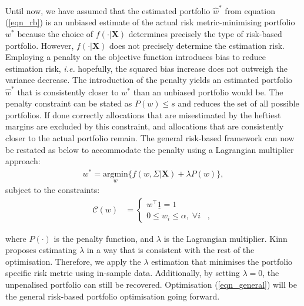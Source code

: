 \documentclass[a4paper,11pt,nocenter,bold,noupper,headcount]{mythesis}
\theoremstyle{plain}
\theoremstyle{definition}
\begin{document}
Until now, we have assumed that the estimated portfolio $\hat{w}^*$ from equation (\ref{eqn_rb}) is an unbiased estimate of the actual risk metric-minimising portfolio $w^*$ because the choice of $f(\cdot | \textbf{X})$ determines precisely the type of risk-based portfolio. However, $f(\cdot|\textbf{X})$ does not precisely determine the estimation risk. Employing a penalty on the objective function introduces bias to reduce estimation risk, \textit{i.e.} hopefully, the squared bias increase does not outweigh the variance decrease. The introduction of the penalty yields an estimated portfolio $\hat{w}^*$ that is consistently closer to $w^*$ than an unbiased portfolio would be. The penalty constraint can be stated as $P(w) \leq s$ and reduces the set of all possible portfolios. If done correctly allocations that are misestimated by the heftiest margins are excluded by this constraint, and allocations that are consistently closer to the actual portfolio remain. The general risk-based framework can now be restated as below to accommodate the penalty using a Lagrangian multiplier approach:
\begin{align} \label{eqn_general}
w^* = \underset{w}{\text{argmin}} \Big \{ f(w, \Sigma| \textbf{X}) + \lambda P(w) \Big \},
\end{align}
subject to the constraints:
\begin{align*}
\mathcal{C}(w) &= 
\begin{cases}
w^\intercal \underline{1} = 1 \;\; \\
0 \leq w_i \leq \alpha, \; \forall i \;\;\; ,
\end{cases}
\end{align*}

where $P(\cdot)$ is the penalty function, and $\lambda$ is the Lagrangian multiplier. Kinn proposes estimating $\lambda$ in a way that is consistent with the rest of the optimisation. Therefore, we apply the $\lambda$ estimation that minimises the portfolio specific risk metric using in-sample data. Additionally, by setting $\lambda =  0$, the unpenalised portfolio can still be recovered. Optimisation (\ref{eqn_general}) will be the general risk-based portfolio optimisation going forward. 
\end{document}

